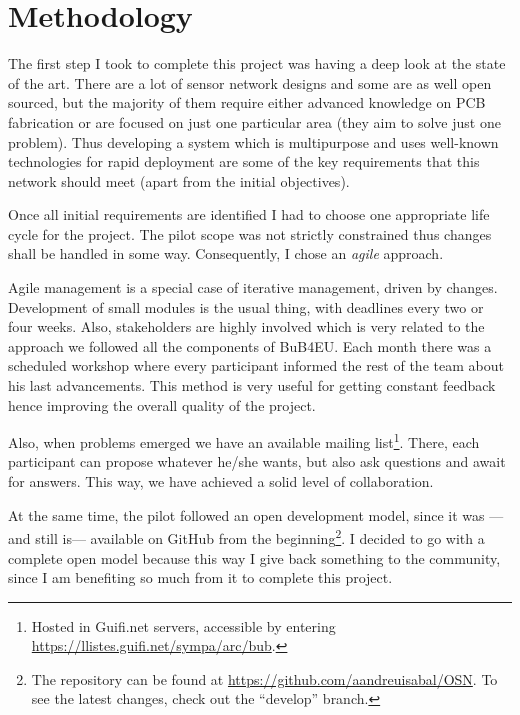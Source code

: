
\chapter{Methodology} %

\label{Chapter4} %



The first step I took to complete this project was having a deep look at the state of the art. There are a lot of sensor network designs and some are as well open sourced, but the majority of them require either advanced knowledge on PCB fabrication or are focused on just one particular area (they aim to solve just one problem). Thus developing a system which is multipurpose and uses well-known technologies for rapid deployment are some of the key requirements that this network should meet (apart from the initial objectives).

Once all initial requirements are identified I had to choose one appropriate life cycle for the project. The pilot scope was not strictly constrained thus changes shall be handled in some way. Consequently, I chose an \emph{agile} approach.

Agile management is a special case of iterative management, driven by changes\citep{pmbok_agile}. Development of small modules is the usual thing, with deadlines every two or four weeks. Also, stakeholders are highly involved which is very related to the approach we followed all the components of BuB4EU. Each month there was a scheduled workshop where every participant informed the rest of the team about his last advancements. This method is very useful for getting constant feedback hence improving the overall quality of the project.

Also, when problems emerged we have an available mailing list\footnote{Hosted in Guifi.net servers, accessible by entering \url{https://llistes.guifi.net/sympa/arc/bub}.}. There, each participant can propose whatever he/she wants, but also ask questions and await for answers. This way, we have achieved a solid level of collaboration.

At the same time, the pilot followed an open development model, since it was ---and still is--- available on GitHub from the beginning\footnote{The repository can be found at \url{https://github.com/aandreuisabal/OSN}. To see the latest changes, check out the ``develop'' branch.}. I decided to go with a complete open model because this way I give back something to the community, since I am benefiting so much from it to complete this project.
